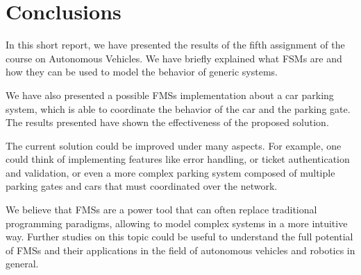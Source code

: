 \section{Conclusions}
\label{sec:conclusions}

In this short report, we have presented the results of the fifth assignment of the course on Autonomous Vehicles.
We have briefly explained what FSMs are and how they can be used to model the behavior of generic systems.

We have also presented a possible FMSs implementation about a car parking system, which is able to coordinate the behavior of the car and the parking gate.
The results presented have shown the effectiveness of the proposed solution.

The current solution could be improved under many aspects.
For example, one could think of implementing features like error handling, or ticket authentication and validation, or even a more complex parking system composed of multiple parking gates and cars that must coordinated over the network.

We believe that FMSs are a power tool that can often replace traditional programming paradigms, allowing to model complex systems in a more intuitive way.
Further studies on this topic could be useful to understand the full potential of FMSs and their applications in the field of autonomous vehicles and robotics in general.